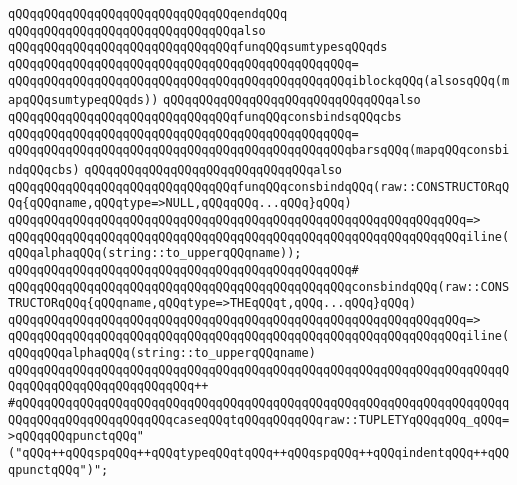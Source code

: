 \verb|qQQqqQQqqQQqqQQqqQQqqQQqqQQqqQQqendqQQq|\newline
\newline
\verb|qQQqqQQqqQQqqQQqqQQqqQQqqQQqqQQqalso|\newline
\verb|qQQqqQQqqQQqqQQqqQQqqQQqqQQqqQQqfunqQQqsumtypesqQQqds|\newline
\verb|qQQqqQQqqQQqqQQqqQQqqQQqqQQqqQQqqQQqqQQqqQQqqQQq=|\newline
\verb|qQQqqQQqqQQqqQQqqQQqqQQqqQQqqQQqqQQqqQQqqQQqqQQqiblockqQQq(alsosqQQq(mapqQQqsumtypeqQQqds))|\newline
\newline
\verb|qQQqqQQqqQQqqQQqqQQqqQQqqQQqqQQqalso|\newline
\verb|qQQqqQQqqQQqqQQqqQQqqQQqqQQqqQQqfunqQQqconsbindsqQQqcbs|\newline
\verb|qQQqqQQqqQQqqQQqqQQqqQQqqQQqqQQqqQQqqQQqqQQqqQQq=|\newline
\verb|qQQqqQQqqQQqqQQqqQQqqQQqqQQqqQQqqQQqqQQqqQQqqQQqbarsqQQq(mapqQQqconsbindqQQqcbs)|\newline
\newline
\verb|qQQqqQQqqQQqqQQqqQQqqQQqqQQqqQQqalso|\newline
\verb|qQQqqQQqqQQqqQQqqQQqqQQqqQQqqQQqfunqQQqconsbindqQQq(raw::CONSTRUCTORqQQq{qQQqname,qQQqtype=>NULL,qQQqqQQq...qQQq}qQQq)|\newline
\verb|qQQqqQQqqQQqqQQqqQQqqQQqqQQqqQQqqQQqqQQqqQQqqQQqqQQqqQQqqQQqqQQq=>|\newline
\verb|qQQqqQQqqQQqqQQqqQQqqQQqqQQqqQQqqQQqqQQqqQQqqQQqqQQqqQQqqQQqqQQqiline(qQQqalphaqQQq(string::to_upperqQQqname));|\newline
\verb|qQQqqQQqqQQqqQQqqQQqqQQqqQQqqQQqqQQqqQQqqQQqqQQq#|\newline
\verb|qQQqqQQqqQQqqQQqqQQqqQQqqQQqqQQqqQQqqQQqqQQqqQQqconsbindqQQq(raw::CONSTRUCTORqQQq{qQQqname,qQQqtype=>THEqQQqt,qQQq...qQQq}qQQq)|\newline
\verb|qQQqqQQqqQQqqQQqqQQqqQQqqQQqqQQqqQQqqQQqqQQqqQQqqQQqqQQqqQQqqQQq=>|\newline
\verb|qQQqqQQqqQQqqQQqqQQqqQQqqQQqqQQqqQQqqQQqqQQqqQQqqQQqqQQqqQQqqQQqiline(qQQqqQQqalphaqQQq(string::to_upperqQQqname)|\newline
\verb|qQQqqQQqqQQqqQQqqQQqqQQqqQQqqQQqqQQqqQQqqQQqqQQqqQQqqQQqqQQqqQQqqQQqqQQqqQQqqQQqqQQqqQQqqQQqqQQq++|\newline
\verb|#qQQqqQQqqQQqqQQqqQQqqQQqqQQqqQQqqQQqqQQqqQQqqQQqqQQqqQQqqQQqqQQqqQQqqQQqqQQqqQQqqQQqqQQqqQQqcaseqQQqtqQQqqQQqqQQqraw::TUPLETYqQQqqQQq_qQQq=>qQQqqQQqpunctqQQq"("qQQq++qQQqspqQQq++qQQqtypeqQQqtqQQq++qQQqspqQQq++qQQqindentqQQq++qQQqpunctqQQq")";|\newline
